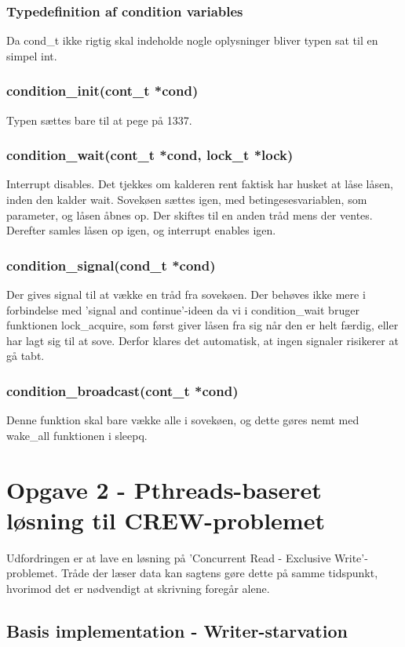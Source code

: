 \documentclass[10pt,a4paper,danish]{article}
\begin{document}
\subsubsection{Typedefinition af condition variables}
Da cond\_t ikke rigtig skal indeholde nogle oplysninger bliver typen sat til en simpel int.

\subsubsection{condition\_init(cont\_t *cond)}
Typen sættes bare til at pege på 1337.

\subsubsection{condition\_wait(cont\_t *cond, lock\_t *lock)}
Interrupt disables. Det tjekkes om kalderen rent faktisk har husket at låse låsen, inden den kalder wait. Sovekøen sættes igen, med betingesesvariablen, som parameter, og låsen åbnes op. Der skiftes til en anden tråd mens der ventes. Derefter samles låsen op igen, og interrupt enables igen.

\subsubsection{condition\_signal(cond\_t *cond)}
Der gives signal til at vække en tråd fra sovekøen. Der behøves ikke mere i forbindelse med 'signal and continue'-ideen da vi i condition\_wait bruger funktionen lock\_acquire, som først giver låsen fra sig når den er helt færdig, eller har lagt sig til at sove. Derfor klares det automatisk, at ingen signaler risikerer at gå tabt.

\subsubsection{condition\_broadcast(cont\_t *cond)}
Denne funktion skal bare vække alle i sovekøen, og dette gøres nemt med wake\_all funktionen i sleepq.

\section{Opgave 2 - Pthreads-baseret løsning til CREW-problemet}
Udfordringen er at lave en løsning på 'Concurrent Read - Exclusive Write'-problemet. Tråde der læser data kan sagtens gøre dette på samme tidspunkt, hvorimod det er nødvendigt at skrivning foregår alene.

\subsection{Basis implementation - Writer-starvation}
\end{document}
